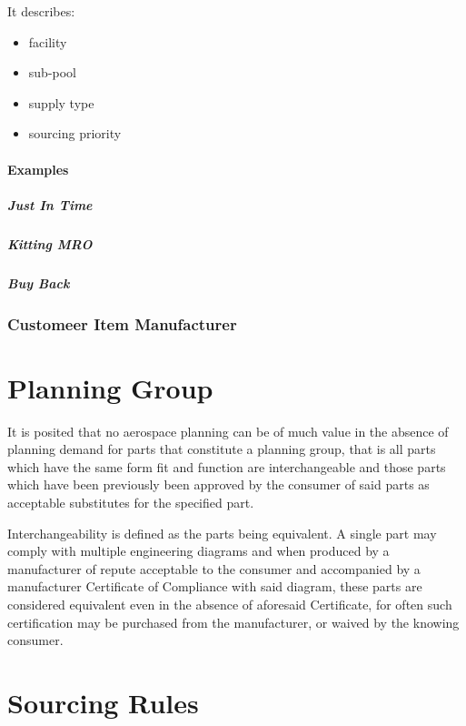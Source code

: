 \documentclass[letterpaper,10pt,english]{sphinxmanual}
\begin{document}
It describes:
\begin{itemize}
\item {} 
facility

\item {} 
sub-pool

\item {} 
supply type

\item {} 
sourcing priority

\end{itemize}


\paragraph{Examples}
\label{APS/Functional:examples}

\subparagraph{Just In Time}
\label{APS/Functional:just-in-time}

\subparagraph{Kitting MRO}
\label{APS/Functional:kitting-mro}

\subparagraph{Buy Back}
\label{APS/Functional:buy-back}

\subsubsection{Customeer Item Manufacturer}
\label{APS/Functional:customeer-item-manufacturer}

\section{Planning Group}
\label{APS/Functional:planning-group}
It is posited that no aerospace planning can be of much value in the
absence of planning demand for parts that constitute a planning group,
that is all parts which have the same form fit and function are
interchangeable and those parts which have been previously been approved
by the consumer of said parts as acceptable substitutes for the
specified part.

Interchangeability is defined as the parts being equivalent. A single
part may comply with multiple engineering diagrams and when produced by
a manufacturer of repute acceptable to the consumer and accompanied by a
manufacturer Certificate of Compliance with said diagram, these parts
are considered equivalent even in the absence of aforesaid Certificate,
for often such certification may be purchased from the manufacturer, or
waived by the knowing consumer.


\section{Sourcing Rules}
\label{APS/Functional:id2}
\end{document}
